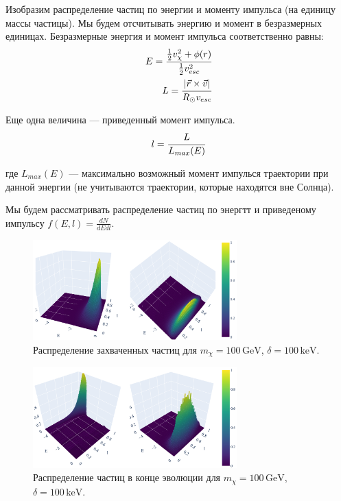 %    

Изобразим распределение частиц по энергии и моменту импульса (на единицу массы частицы). Мы будем отсчитывать энергию и момент в безразмерных единицах. Безразмерные энергия и момент импульса соответственно равны:
\begin{equation}
	\begin{split}
		E = \cfrac{\frac{1}{2} v_{\chi}^2 + \phi(r)}
		{\frac{1}{2} v_{esc}^2} \\
		L = \cfrac{|\vec{r} \times \vec{v}|}
		{R_{\odot} v_{esc}}
	\end{split}
	\label{eq:dimentionless}
\end{equation}

Еще одна величина --- приведенный момент импульса.
\begin{equation}
	l = \cfrac{L}{L_{max}(E)}
\end{equation}

где $L_{max}(E)$ --- максимально возможный момент импулься траектории при данной энергии (не учитываются траектории, которые находятся вне Солнца).

Мы будем рассматривать распределение частиц по энергтт и приведеному импульсу $f(E,l) = \frac{dN}{dE dl}$.

\begin{figure}[ht]
	\centering
	\includegraphics[width=0.7\textwidth]
	{images/Capt100_100.png}
	\caption{Распределение захваченных частиц для $m_{\chi} = 100\, \text{GeV}$, $\delta = 100\, \text{keV}$.}
	\label{fig:Capt100_100}
\end{figure}

\begin{figure}[!h]
	\centering
	\includegraphics[width=0.7\textwidth]
	{images/Dout100_100.png}
	\caption{Распределение частиц в конце эволюции для $m_{\chi} = 100\, \text{GeV}$, $\delta = 100\, \text{keV}$.}
	\label{fig:Dout100_100}
\end{figure}

